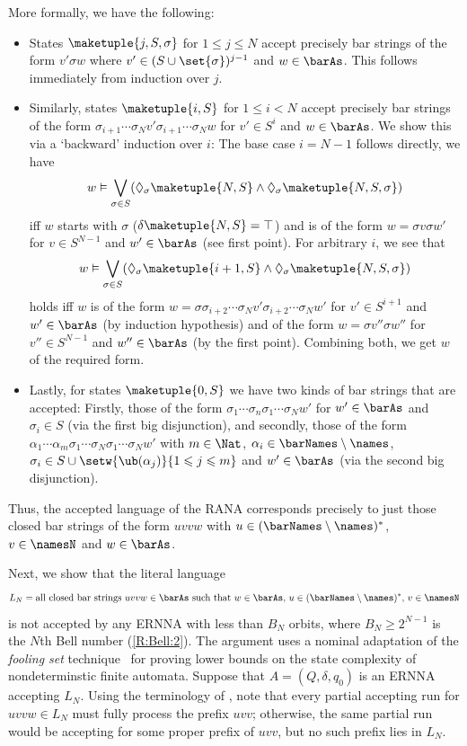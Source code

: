 \documentclass[10pt, final, conference, a4paper, twocolumn]{IEEEtran}
\renewcommand{\enquote}[1]{`#1'}
\begin{document}
More formally, we have the following:
\begin{itemize}
  \item States $\maketuple{j, S, \sigma}$ for $1 \leqslant j \leqslant N$ accept precisely bar strings of the form 
    $v'\sigma w$ where $v' \in (S \cup \set{\sigma})^{j - 1}$ and $w \in \barAs$. This follows immediately from
    induction over $j$.
  \item Similarly, states $\maketuple{i, S}$ for $1 \leqslant i < N$ accept precisely bar strings of the form
    $\sigma_{i+1}\cdots\sigma_Nv'\sigma_{i+1}\cdots\sigma_N w$ for $v' \in S^{i}$ and $w \in \barAs$.
    We show this via a \enquote{backward} induction over $i$: The base case $i = N - 1$ follows directly, we have
    \[ w\vDash\bigvee_{\sigma \in S} (\Diamond_\sigma\maketuple{N, S}\wedge\Diamond_\sigma\maketuple{N, S, \sigma}) \]
    iff $w$ starts with $\sigma$ ($\delta\maketuple{N, S} = \top$) and is of the form $w = \sigma v\sigma w'$
    for $v \in S^{N - 1}$ and $w' \in \barAs$ (see first point).
    For arbitrary $i$, we see that
    \[ w\vDash\bigvee_{\sigma \in S} (\Diamond_\sigma\maketuple{i + 1, S}\wedge
      \Diamond_\sigma\maketuple{N, S, \sigma}) \] 
    holds iff $w$ is of the form
    $w = \sigma\sigma_{i+2}\cdots\sigma_Nv'\sigma_{i+2}\cdots\sigma_Nw'$ for $v' \in S^{i+1}$ and $w' \in \barAs$
    (by induction hypothesis) and of the form $w = \sigma v''\sigma w''$ for $v'' \in S^{N-1}$ and $w'' \in \barAs$
    (by the first point). Combining both, we get $w$ of the required form.
  \item Lastly, for states $\maketuple{0,S}$ we have two kinds of bar strings that are accepted: Firstly, those
    of the form $\sigma_1\cdots\sigma_n\sigma_1\cdots\sigma_Nw'$ for $w' \in \barAs$ and $\sigma_i \in S$ (via
    the first big disjunction), and secondly, those of the form 
    $\alpha_1\cdots\alpha_m\sigma_1\cdots\sigma_N\sigma_1\cdots\sigma_Nw'$ with $m \in \Nat$, $\alpha_i \in
    \barNames\setminus\names$, $\sigma_i \in S \cup \setw{\ub(\alpha_j)}{1 \leqslant j \leqslant m}$ and
    $w' \in \barAs$ (via the second big disjunction).
\end{itemize}
Thus, the accepted language of the RANA corresponds precisely to just those closed bar strings of the form
$uvvw$ with $u \in (\barNames\setminus\names)^*$, $v \in \namesN$ and $w \in \barAs$.

Next, we show that the literal language 
\[L_{N} = \text{all closed bar strings
  $uvvw \in \barAs$ such that $w \in \barAs$, $u \in (\barNames\setminus\names)^*$, $v \in \namesN$}\]
is not accepted by any ERNNA with less than $B_N$ orbits, where $B_N\geq 2^{N-1}$ is the $N$th Bell
number (\ref{R:Bell:2}). The argument uses a nominal adaptation of the \emph{fooling set} technique~\cite{hk11} for proving lower bounds on the state complexity of nondeterminstic finite automata. Suppose that $A=(Q,\delta,q_0)$ is an ERNNA accepting $L_N$. Using the terminology of , note that every partial accepting run for $uvvw\in L_N$ must fully process the prefix $uvv$; otherwise, the same partial run would be accepting for some proper prefix of $uvv$, but no such prefix lies in $L_N$. 
\end{document}
